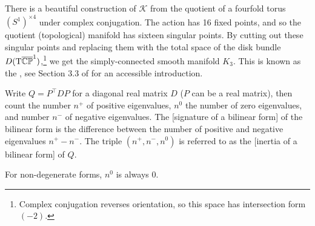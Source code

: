 \begin{remark*}\label{rmk:kummer-construction}
	There is a beautiful construction of $\mathcal{K}$ from the quotient of a fourfold torus $(S^1)^{\times 4}$ under complex conjugation. The action has 16 fixed points, and so the quotient (topological) manifold has sixteen singular points. By cutting out these singular points and replacing them with the total space of the disk bundle ${D}(\mathrm{T} \overline{\mathbb{CP}}^1)$,\footnote{Complex conjugation reverses orientation, so this space has intersection form $(-2)$.} we get the simply-connected smooth manifold $K_3$. This is known as the , see Section 3.3 of \cite{scorpan2005wild} for an accessible introduction.
\end{remark*}

\begin{definition}
	Write $Q=P^\intercal D P$ for a diagonal real matrix $D$ ($P$ can be a real matrix), then count the number $n^+$ of positive eigenvalues, $n^0$ the number of zero eigenvalues, and number $n^-$ of negative eigenvalues. The [signature of a bilinear form] of the bilinear form is the difference between the number of positive and negative eigenvalues $n^+-n^-$.
	The triple $(n^+, n^-, n^0)$ is referred to as the [inertia of a bilinear form] of $Q$.
\end{definition}

\begin{remark*}
	For non-degenerate forms, $n^0$ is always $0$.
\end{remark*}

